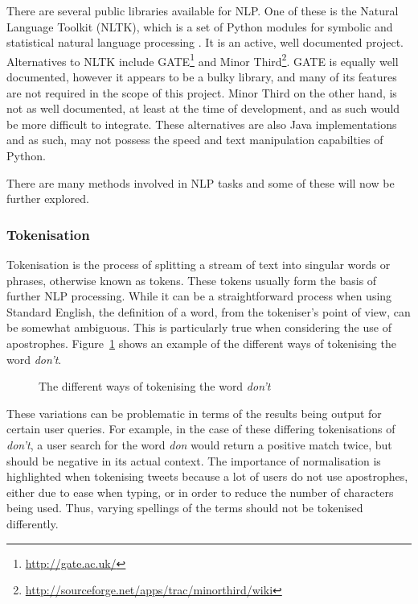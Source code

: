 There are several public libraries available for NLP. One of these is the Natural Language Toolkit (NLTK), which is a set of Python modules for symbolic and statistical natural language processing \cite{NLTK}. It is an active, well documented project. Alternatives to NLTK include GATE\footnote{\url{http://gate.ac.uk/}} and Minor Third\footnote{\url{http://sourceforge.net/apps/trac/minorthird/wiki}}. GATE is equally well documented, however it appears to be a bulky library, and many of its features are not required in the scope of this project. Minor Third on the other hand, is not as well documented, at least at the time of development, and as such would be more difficult to integrate. These alternatives are also Java implementations and as such, may not possess the speed and text manipulation capabilties of Python.

There are many methods involved in NLP tasks and some of these will now be further explored.

\subsubsection{Tokenisation}
Tokenisation is the process of splitting a stream of text into singular words or phrases, otherwise known as tokens. These tokens usually form the basis of further NLP processing. While it can be a straightforward process when using Standard English, the definition of a word, from the tokeniser's point of view, can be somewhat ambiguous. This is particularly true when considering the use of apostrophes. Figure~\ref{fig:tokenisation} shows an example of the different ways of tokenising the word \emph{don't}.

\begin{figure}[h!]
  \centering
  
  \caption{The different ways of tokenising the word \emph{don't}
    \label{fig:tokenisation}}
\end{figure}

These variations can be problematic in terms of the results being output for certain user queries. For example, in the case of these differing tokenisations of \emph{don't}, a user search for the word \emph{don} would return a positive match twice, but should be negative in its actual context. The importance of normalisation is highlighted when tokenising tweets because a lot of users do not use apostrophes, either due to ease when typing, or in order to reduce the number of characters being used. Thus, varying spellings of the terms should not be tokenised differently.

